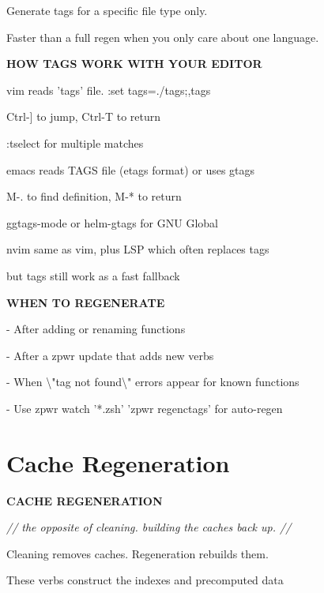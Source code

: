 \documentclass[11pt,a4paper,twoside]{book}
\begin{document}
Generate tags for a specific file type only.

Faster than a full regen when you only care about one language.


\vspace{12pt}
{\bfseries\color{neonyellow} HOW TAGS WORK WITH YOUR EDITOR}\vspace{4pt}

vim    reads 'tags' file. :set tags=./tags;,tags

Ctrl-] to jump, Ctrl-T to return

:tselect for multiple matches

emacs  reads TAGS file (etags format) or uses gtags

M-. to find definition, M-* to return

ggtags-mode or helm-gtags for GNU Global

nvim   same as vim, plus LSP which often replaces tags

but tags still work as a fast fallback


\vspace{12pt}
{\bfseries\color{neonyellow} WHEN TO REGENERATE}\vspace{4pt}

- After adding or renaming functions

- After a zpwr update that adds new verbs

- When \textbackslash{}"tag not found\textbackslash{}" errors appear for known functions

\begin{codebox}
- Use zpwr watch '*.zsh' 'zpwr regenctags' for auto-regen\\
\end{codebox}


\vspace{16pt}

\section{Cache Regeneration}


\vspace{10pt}
{\large\bfseries\color{neoncyan} CACHE REGENERATION}\vspace{6pt}

{\small\itshape\color{dimtext} // the opposite of cleaning. building the caches back up. //}

Cleaning removes caches. Regeneration rebuilds them.

These verbs construct the indexes and precomputed data
\end{document}
